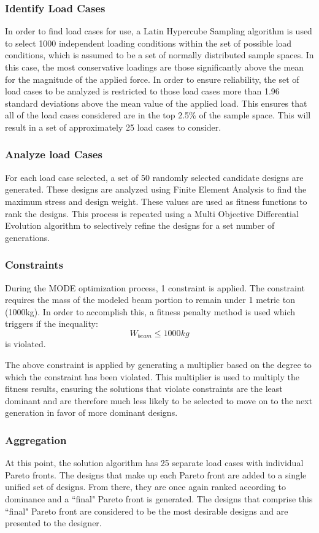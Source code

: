 \subsubsection{Identify Load Cases}
In order to find load cases for use, a Latin Hypercube Sampling algorithm is used to select 1000 independent loading conditions within the set of possible load conditions, which is assumed to be a set of normally distributed sample spaces. In this case, the most conservative loadings are those significantly above the mean for the magnitude of the applied force. In order to ensure reliability, the set of load cases to be analyzed is restricted to those load cases more than 1.96 standard deviations above the mean value of the applied load. This ensures that all of the load cases considered are in the top 2.5\% of the sample space. This will result in a set of approximately 25 load cases to consider. 
\subsubsection{Analyze load Cases} 
For each load case selected, a set of 50 randomly selected candidate designs are generated. These designs are analyzed using Finite Element Analysis to find the maximum stress and design weight. These values are used as fitness functions to rank the designs. This process is repeated using a Multi Objective Differential Evolution algorithm to selectively refine the designs for a set number of generations. 
\subsubsection{Constraints}
During the MODE optimization process, 1 constraint is applied. The constraint requires the mass of the modeled beam portion to remain under 1 metric ton (1000kg). In order to accomplish this, a fitness penalty method is used which triggers if the inequality:
$$
W_{beam} \leq 1000kg
$$
is violated. 

The above constraint is applied by generating a multiplier based on the degree to which the constraint has been violated. This multiplier is used to multiply the fitness results, ensuring the solutions that violate constraints are the least dominant and are therefore much less likely to be selected to move on to the next generation in favor of more dominant designs. 

\subsubsection{Aggregation}
At this point, the solution algorithm has 25 separate load cases with individual Pareto fronts. The designs that make up each Pareto front are added to a single unified set of designs. From there, they are once again ranked according to dominance and a ``final" Pareto front is generated. The designs that comprise this ``final" Pareto front are considered to be the most desirable designs and are presented to the designer.

